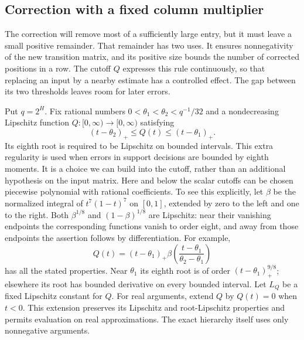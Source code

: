 \subsection{Correction with a fixed column multiplier}

The correction will remove most of a sufficiently large entry, but it must leave a small positive remainder. That remainder has two uses. It ensures nonnegativity of the new transition matrix, and its positive size bounds the number of corrected positions in a row. The cutoff $Q$ expresses this rule continuously, so that replacing an input by a nearby estimate has a controlled effect. The gap between its two thresholds leaves room for later errors.

Put $q=2^H$.  Fix rational numbers
$0<\theta_1<\theta_2<q^{-1}/32$ and a nondecreasing Lipschitz function
$Q:[0,\infty)\to[0,\infty)$ satisfying
\begin{equation}
 (t-\theta_2)_+\leq Q(t)\leq(t-\theta_1)_+.
 \label{eq:hier-Q}
\end{equation}
Its eighth root is required to be Lipschitz on bounded intervals. This extra regularity is used when errors in support decisions are bounded by eighth moments. It is a choice we can build into the cutoff, rather than an additional hypothesis on the input matrix.
Here and below the scalar cutoffs can be chosen piecewise polynomial with
rational coefficients.  To see this explicitly, let $\beta$ be the
normalized integral of $t^7(1-t)^7$ on $[0,1]$, extended by zero to the
left and one to the right.  Both $\beta^{1/8}$ and
$(1-\beta)^{1/8}$ are Lipschitz: near their vanishing endpoints the
corresponding functions vanish to order eight, and away from those
endpoints the assertion follows by differentiation.  For example,
\[
 Q(t)=(t-\theta_1)_+
       \beta\left(\frac{t-\theta_1}{\theta_2-\theta_1}\right)
\]
has all the stated properties.  Near $\theta_1$ its eighth root is of
order $(t-\theta_1)_+^{9/8}$; elsewhere its root has bounded derivative
on every bounded interval.  Let $L_Q$ be a fixed Lipschitz constant for
$Q$.  For real arguments, extend $Q$ by $Q(t)=0$ when $t<0$.
This extension preserves its Lipschitz and root-Lipschitz properties and
permits evaluation on real approximations.  The exact hierarchy itself
uses only nonnegative arguments.

